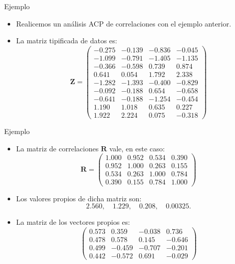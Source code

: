\documentclass[
  ignorenonframetext,
]{beamer}
\providecommand{\tightlist}{%
  \setlength{\itemsep}{0pt}\setlength{\parskip}{0pt}}
\begin{document}
\begin{frame}{Ejemplo}
\label{ejemplo-11}
\begin{itemize}
\tightlist
\item
  Realicemos un análisis ACP de correlaciones con el ejemplo anterior.
\item
  La matriz tipificada de datos es: \[
  \mathbf{Z}=
  \left(
  \begin{array}{rrrr}
  -0.275 & -0.139 & -0.836 & -0.045 \\
   -1.099 & -0.791 & -1.405 & -1.135 \\
   -0.366 & -0.598 & 0.739 & 0.874 \\
   0.641 & 0.054 & 1.792 & 2.338 \\
   -1.282 & -1.393 & -0.400 & -0.829 \\
   -0.092 & -0.188 & 0.654 & -0.658 \\
   -0.641 & -0.188 & -1.254 & -0.454 \\
   1.190 & 1.018 & 0.635 & 0.227 \\
   1.922 & 2.224 & 0.075 & -0.318 
  \end{array}
  \right)
  \]
\end{itemize}
\end{frame}

\begin{frame}{Ejemplo}
\label{ejemplo-12}
\begin{itemize}
\tightlist
\item
  La matriz de correlaciones \(\mathbf{R}\) vale, en este caso: \[
  \mathbf{R} =
  \left(
  \begin{array}{rrrr}
  1.000 & 0.952 & 0.534 & 0.390 \\
  0.952 & 1.000 & 0.263 & 0.155 \\
  0.534 & 0.263 & 1.000 & 0.784 \\
  0.390 & 0.155 & 0.784 & 1.000 
  \end{array}
  \right)
  \]
\item
  Los valores propios de dicha matriz son: \[
  2.560,\quad 1.229,\quad 0.208,\quad 0.00325.
  \]
\item
  La matriz de los vectores propios es: \[
  \left(
  \begin{array}{rrrr}
  0.573 & 0.359 & -0.038 & 0.736 \\
  0.478 & 0.578 & 0.145 & -0.646 \\
  0.499 & -0.459 & -0.707 & -0.201 \\
  0.442 & -0.572 & 0.691 & -0.029 
  \end{array}
  \right)
  \]
\end{itemize}
\end{frame}
\end{document}
